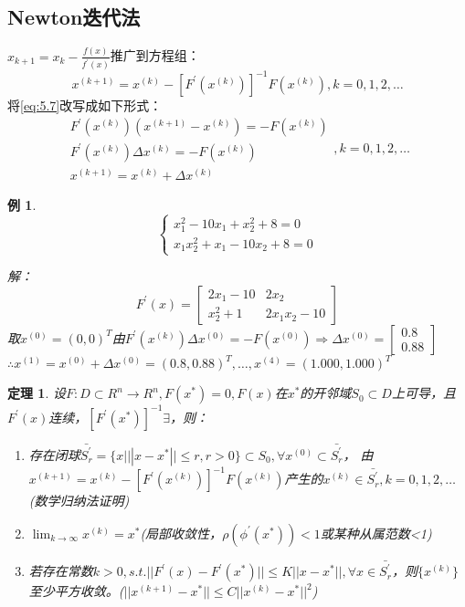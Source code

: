 \documentclass[a4paper]{article}
\newtheorem{theorem}{定理}[section]
\newtheorem{example}{例}[section]
\begin{document}
\subsection{Newton迭代法}
$x_{k+1}=x_k-\frac{f(x)}{f^{'}(x)} $推广到方程组：
\begin{equation}
    x^{(k+1)}=x^{(k)}-[F^{'}(x^{(k)})]^{-1}F(x^{(k)}) , k=0,1,2,\dots
    \label{eq:5.7}
\end{equation}
将\ref{eq:5.7}改写成如下形式：
\begin{equation*}
    \begin{array}{lr}
        F^{'}(x^{(k)})(x^{(k+1)}-x^{(k)})=-F(x^{(k)})\\
        F^{'}(x^{(k)})\Delta x^{(k)}=-F(x^{(k)}) \\
        x^{(k+1)}=x^{(k)}+\Delta x^{(k)}
    \end{array}
    ,k=0,1,2,\dots
\end{equation*}

\begin{example}
    $$\left\{
        \begin{array}{lr}
            x_1^2-10x_1+x_2^2+8=0\\
            x_1x_2^2+x_1-10x_2+8=0
        \end{array}\right.
        $$
    
    解：
    $$F^{'}(x)=\left[\begin{matrix}
        2x_1-10 & 2x_2 \\
        x_2^2+1 & 2x_1x_2-10
    \end{matrix}\right] $$
    取$x^{(0)}=(0, 0)^T $由$F^{'}(x^{(k)})\Delta x^{(0)}=-F(x^{(0)})\Rightarrow \Delta x^{(0)}=\left[\begin{matrix}
        0.8 \\ 0.88
    \end{matrix}\right] $\\
    $\therefore x^{(1)}=x^{(0)}+\Delta x^{(0)}=(0.8, 0.88)^T, \dots, x^{(4)}=(1.000, 1.000)^T $
\end{example}

\begin{theorem}
    设$F:D\subset R^n\rightarrow R^n, F(x^*)=0, F(x)$在$x^*$的开邻域$S_0\subset D$上可导，且$F^{'}(x) $连续，$[F^{'}(x^*)]^{-1}\exists$，则：
    \begin{enumerate}
        \item 存在闭球$\bar{S_r^{'}}=\{x|||x-x^*||\le r, r>0\}\subset S_0, \forall x^{(0)}\subset \bar{S_r^{'}} $，
            由$x^{(k+1)}=x^{(k)}-[F^{'}(x^{(k)})]^{-1}F(x^{(k)}) $产生的$x^{(k)}\in \bar{S_r^{'}}, k=0,1,2,\dots$(数学归纳法证明)
        \item $\lim_{k\rightarrow\infty} x^{(k)}=x^*$(局部收敛性，$\rho(\phi^{'}(x^*))<1$或某种从属范数<1)
        \item 若存在常数$k>0, s.t. ||F^{'}(x)-F^{'}(x^*) ||\le K||x-x^*||, \forall x \in \bar{S_r^{'}}$，则$\{x^{(k)} \}$至少平方收敛。($||x^{(k+1)}-x^*||\le C||x^{(k)}-x^*||^2$)
    \end{enumerate}
\end{theorem}
\end{document}

